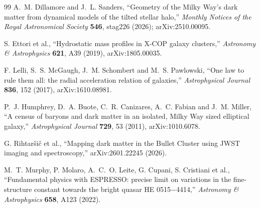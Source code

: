 \documentclass[11pt]{article}
\begin{document}
\begin{thebibliography}{99}
A.~M. Dillamore and J.~L. Sanders,
``Geometry of the Milky Way's dark matter from dynamical models of the tilted stellar halo,''
\emph{Monthly Notices of the Royal Astronomical Society} \textbf{546}, stag226 (2026); arXiv:2510.00095.

S. Ettori et al.,
``Hydrostatic mass profiles in X-COP galaxy clusters,''
\emph{Astronomy \& Astrophysics} \textbf{621}, A39 (2019), arXiv:1805.00035.

F. Lelli, S.~S. McGaugh, J.~M. Schombert and M.~S. Pawlowski,
``One law to rule them all: the radial acceleration relation of galaxies,''
\emph{Astrophysical Journal} \textbf{836}, 152 (2017), arXiv:1610.08981.

P.~J. Humphrey, D.~A. Buote, C.~R. Canizares, A.~C. Fabian and J.~M. Miller,
``A census of baryons and dark matter in an isolated, Milky Way sized elliptical galaxy,''
\emph{Astrophysical Journal} \textbf{729}, 53 (2011), arXiv:1010.6078.

G. Rihtar\v{s}i\v{c} et al.,
``Mapping dark matter in the Bullet Cluster using JWST imaging and spectroscopy,''
arXiv:2601.22245 (2026).

M.~T. Murphy, P. Molaro, A.~C.~O. Leite, G. Cupani, S. Cristiani et al.,
``Fundamental physics with ESPRESSO: precise limit on variations in the fine-structure constant towards the bright quasar HE 0515$-$4414,''
\emph{Astronomy \& Astrophysics} \textbf{658}, A123 (2022).
\end{thebibliography}
\end{document}
